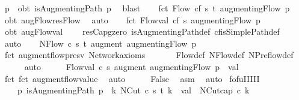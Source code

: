 \begin{isabellebody}
\ p\ \ obt{\isacharcolon}\ {\isachardoublequoteopen}isAugmentingPath\ p{\isachardoublequoteclose}\ \isamarkupfalse%
\ blast\isanewline
\ \ \isamarkupfalse%
\ fct{}{\isacharcolon}\ {\isachardoublequoteopen}Flow\ cf\ s\ t\ {\isacharparenleft}augmentingFlow\ p{\isacharparenright}{\isachardoublequoteclose}\ \isamarkupfalse%
\ obt\ augFlow{\isacharunderscore}resFlow\ \isamarkupfalse%
\ auto\isanewline
\ \ \isamarkupfalse%
\ fct{}{\isacharcolon}\ {\isachardoublequoteopen}Flow{\isachardot}val\ cf\ s\ {\isacharparenleft}augmentingFlow\ p{\isacharparenright}\ {\isachargreater}\ {}{\isachardoublequoteclose}\ \isamarkupfalse%
\ obt\ augFlow{\isacharunderscore}val\isanewline
\ \ \ \ resCap{\isacharunderscore}gzero\ isAugmentingPath{\isacharunderscore}def\ cf{\isachardot}isSimplePath{\isacharunderscore}def\ \isamarkupfalse%
\ auto\isanewline
\ \ \isamarkupfalse%
\ {\isachardoublequoteopen}NFlow\ c\ s\ t\ {\isacharparenleft}augment\ {\isacharparenleft}augmentingFlow\ p{\isacharparenright}{\isacharparenright}{\isachardoublequoteclose}\ \isanewline
\ \ \ \ \isamarkupfalse%
\ fct{}\ augment{\isacharunderscore}flow{\isacharunderscore}presv\ Network{\isacharunderscore}axioms\ \isanewline
\ \ \ \ \isamarkupfalse%
\ Flow{\isacharunderscore}def\ NFlow{\isacharunderscore}def\ NPreflow{\isacharunderscore}def\ \isanewline
\ \ \ \ \isamarkupfalse%
\ auto\isanewline
\ \ \isamarkupfalse%
\ \isamarkupfalse%
\ {\isachardoublequoteopen}Flow{\isachardot}val\ c\ s\ {\isacharparenleft}augment\ {\isacharparenleft}augmentingFlow\ p{\isacharparenright}{\isacharparenright}\ {\isachargreater}\ val{\isachardoublequoteclose}\ \isanewline
\ \ \ \ \isamarkupfalse%
\ fct{}\ fct{}\ augment{\isacharunderscore}flow{\isacharunderscore}value\ \isamarkupfalse%
\ auto\isanewline
\ \ \isamarkupfalse%
\ \isamarkupfalse%
\ {\isachardoublequoteopen}False{\isachardoublequoteclose}\ \isamarkupfalse%
\ asm\ \isamarkupfalse%
\ auto\isanewline
{}\isamarkupfalse%
%
\endisatagproof
{\isafoldproof}%
%
\isadelimproof
\isanewline
%
\endisadelimproof
\isanewline
{}\isamarkupfalse%
\ fofu{\isacharunderscore}II{\isacharunderscore}III{\isacharcolon}\ \isanewline
\ \ {\isachardoublequoteopen}{\isasymnot}\ {\isacharparenleft}{\isasymexists}\ p{\isachardot}\ isAugmentingPath\ p{\isacharparenright}\ {\isasymLongrightarrow}\ {\isasymexists}k{\isacharprime}{\isachardot}\ NCut\ c\ s\ t\ k{\isacharprime}\ {\isasymand}\ val\ {\isacharequal}\ NCut{\isachardot}cap\ c\ k{\isacharprime}{\isachardoublequoteclose}\ \isanewline

\end{isabellebody}
